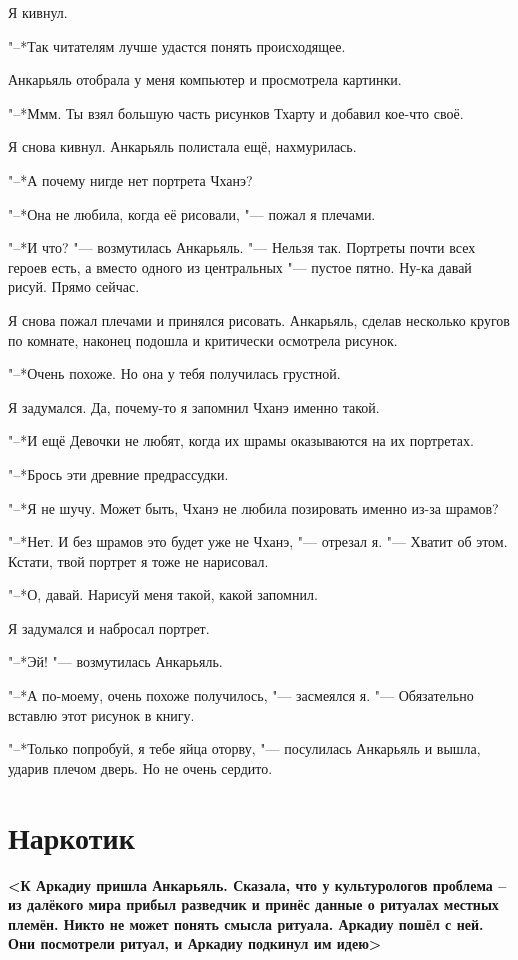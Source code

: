 \documentclass[a4paper,10pt]{book}
\newcommand{\ldotst}{\so{...}\xspace}
\begin{document}
Я кивнул.

"--*Так читателям лучше удастся понять происходящее.

Анкарьяль отобрала у меня компьютер и просмотрела картинки.

"--*Ммм. Ты взял большую часть рисунков Тхарту и добавил кое-что своё.

Я снова кивнул. Анкарьяль полистала ещё, нахмурилась.

"--*А почему нигде нет портрета Чханэ?

"--*Она не любила, когда её рисовали, "--- пожал я плечами.

"--*И что? "--- возмутилась Анкарьяль. "--- Нельзя так. Портреты почти всех 
героев есть, а вместо одного из центральных "--- пустое пятно. Ну-ка давай 
рисуй. Прямо сейчас.

Я снова пожал плечами и принялся рисовать. Анкарьяль, сделав несколько кругов 
по комнате, наконец подошла и критически осмотрела рисунок.

"--*Очень похоже. Но она у тебя получилась грустной.

Я задумался. Да, почему-то я запомнил Чханэ именно такой.

"--*И ещё\ldotst Девочки не любят, когда их шрамы оказываются на их портретах.

"--*Брось эти древние предрассудки.

"--*Я не шучу. Может быть, Чханэ не любила позировать именно из-за шрамов?

"--*Нет. И без шрамов это будет уже не Чханэ, "--- отрезал я. "--- Хватит об 
этом. Кстати, твой портрет я тоже не нарисовал.

"--*О, давай. Нарисуй меня такой, какой запомнил.

Я задумался и набросал портрет.

"--*Эй! "--- возмутилась Анкарьяль.

"--*А по-моему, очень похоже получилось, "--- засмеялся я. "--- Обязательно 
вставлю этот рисунок в книгу.

"--*Только попробуй, я тебе яйца оторву, "--- посулилась Анкарьяль и вышла, 
ударив плечом дверь. Но не очень сердито.


\section{Наркотик}

\textbf{<К Аркадиу пришла Анкарьяль. Сказала, что у культурологов проблема – из 
далёкого мира прибыл разведчик и принёс данные о ритуалах местных племён. Никто 
не может понять смысла ритуала. Аркадиу пошёл с ней. Они посмотрели ритуал, и 
Аркадиу подкинул им идею>}
\end{document}
